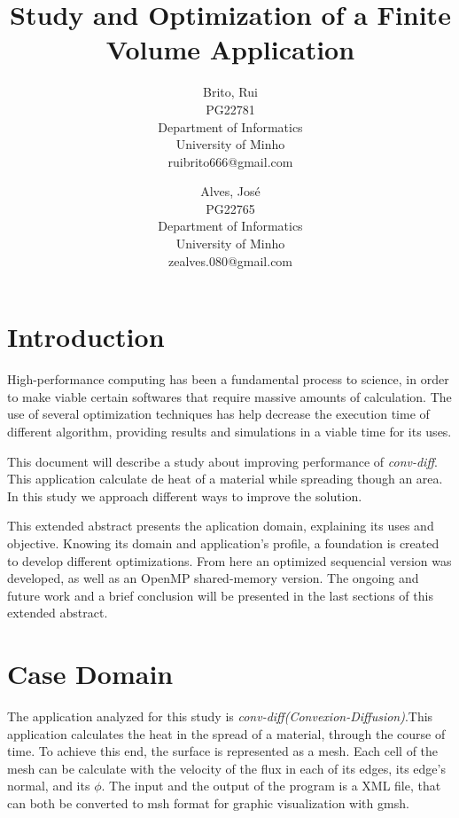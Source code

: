 \documentclass[a4paper,10pt,openright,openbib,twocolumn]{article}
\begin{document}
\begin{multicols}{2}
\title{Study and Optimization of a Finite Volume Application}
\author{
    Brito, Rui\\
    PG22781\\
    Department of Informatics\\
    University of Minho\\
    ruibrito666@gmail.com
  \and
    Alves, José\\
    PG22765\\
    Department of Informatics\\
    University of Minho\\
    zealves.080@gmail.com
}
\date{}
\maketitle
\end{multicols}

\section{Introduction}

High-performance computing has been a fundamental process to science, in order to make viable certain softwares that require massive amounts of calculation. The use of several optimization techniques has help decrease the execution time of different algorithm, providing results and simulations in a viable time for its uses.

This document will describe a study about improving performance of \emph{conv-diff}. This application calculate de heat of a material while spreading though an area. In this study we approach different ways to improve the solution.

This extended abstract presents the aplication domain, explaining its uses and objective. Knowing its domain and application's profile, a foundation is created to develop different optimizations. From here an optimized sequencial version was developed, as well as an OpenMP shared-memory version. The ongoing and future work and a brief conclusion will be presented in the last sections of this extended abstract.

\section{Case Domain}

The application analyzed for this study is \emph{conv-diff(Convexion-Diffusion)}.This application calculates the heat in the spread of a material, through the course of time. To achieve this end, the surface is represented as a mesh. Each cell of the mesh can be calculate with the velocity of the flux in each of its edges, its edge's normal, and its $\phi$.
The input and the output of the program is a XML file, that can both be converted to msh format for graphic visualization with gmsh.
\end{document}
